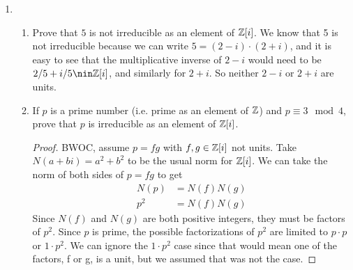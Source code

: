 \documentclass[12pt]{article}
\begin{document}
\begin{enumerate}
\begin{enumerate}
\begin{proof}
				Let $L \in R$ with $a|L$ and $b|L$. So $L = an$ and $L = bm$ for some $n,m \in R$.
				\begin{align*}
					L =& an = da'n \\
					L =& bm = db'm \\
					\implies& a'n = b'm
				\end{align*}
				Since $\gcd(a',b')=1$ , there exists $x,y \in R$ s.t. $a'x + b'y = 1$.
				\begin{align*}
					a'x + b'y &= 1 \\
					n(a'x + b'y) &= n \\
					a'nx + b'ny &= n \\
					b'mx + b'ny &= n \\
					b'(mx + ny) &= n
				\end{align*}
				So then $b' | n$, and it is a similar argument for $a' | m$. So we have $n = b'z$ for some $z\in R$, meaning $L = da'n = da'b'z = \ell z$. So finally we have $\ell|L$.
			\end{proof}
		\end{enumerate}
		
		
		\item 
		\begin{enumerate}
			\item Prove that $5$ is not irreducible as an element of $\mathbb{Z}[i]$.\m
			We know that 5 is not irreducible because we can write $5 = (2-i)\cdot(2+i)$, and it is easy to see that the multiplicative inverse of $2-i$ would need to be $2/5 + i/5 \nin \Z[i]$, and similarly for $2+i$. So neither $2-i$ or $2+i$ are units.

			\item If $p$ is a prime number (i.e. prime as an element of $\mathbb{Z}$) and $p \equiv 3 \mod 4$, prove that $p$ is irreducible as an element of $\mathbb{Z}[i]$.
			\begin{proof}
				BWOC, assume $p = fg$ with $f,g \in \mathbb{Z}[i]$ not units. Take $N(a+bi) = a^2 + b^2$ to be the usual norm for $\mathbb{Z}[i]$. We can take the norm of both sides of $p=fg$ to get
				\begin{align*}
					N(p) &= N(f)N(g)\\
					p^2 &= N(f)N(g)
				\end{align*}
				Since $N(f)$ and $N(g)$ are both positive integers, they must be factors of $p^2$. Since $p$ is prime, the possible factorizations of $p^2$ are limited to $p \cdot p$ or $1 \cdot p^2$. We can ignore the $1 \cdot p^2$ case since that would mean one of the factors, f or g,  is a unit, but we assumed that was not the case.
				

\end{proof}
\end{enumerate}
\end{enumerate}
\end{document}
